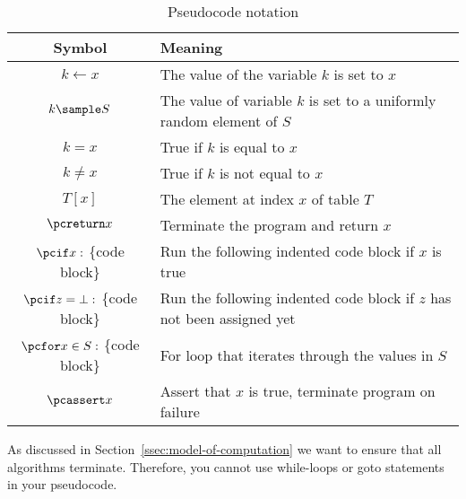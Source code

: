 \begin{table}
  \begin{center}
    \begin{tabular}{c | l}
      Symbol                           & Meaning                                                                \\ \hline
      $k \gets x$                      & The value of the variable $k$ is set to $x$                            \\
      $k \sample S$                    & The value of variable $k$ is set to a uniformly random element of $S$  \\
      $k = x$                          & True if $k$ is equal to $x$                                            \\
      $k \neq x$                       & True if $k$ is not equal to $x$                                        \\
      $T[x]$                           & The element at index $x$ of table $T$                                  \\
      $\pcreturn x$                    & Terminate the program and return $x$                                   \\
      $\pcif x:$ \{code block\}        & Run the following indented code block if $x$ is true                   \\
      $\pcif z=\bot:$ \{code block\}   & Run the following indented code block if $z$ has not been assigned yet \\
      $\pcfor x \in S:$ \{code block\} & For loop that iterates through the values in $S$                       \\
      $\pcassert x$                    & Assert that $x$ is true, terminate program on failure                  \\
    \end{tabular}
  \end{center}
  \caption{Pseudocode notation}\label{table:pseudocode-notation}
\end{table}

As discussed in Section~\ref{ssec:model-of-computation} we want to ensure that all algorithms terminate. Therefore, you cannot use while-loops or goto statements in your pseudocode.


